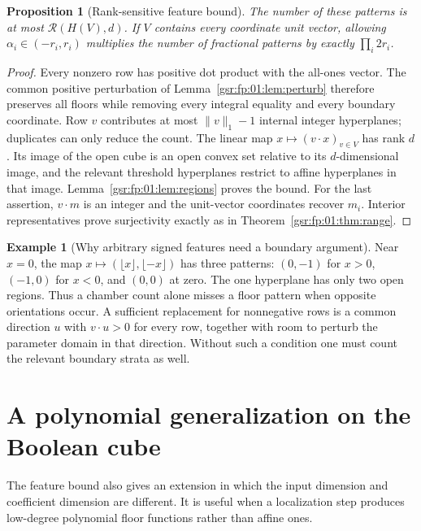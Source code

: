 \documentclass[11pt,letterpaper]{article}
\numberwithin{equation}{section}
\newtheorem{proposition}[theorem]{Proposition}
\theoremstyle{definition}
\newtheorem{example}[theorem]{Example}
\theoremstyle{remark}
\newcommand{\1}{\mathbf 1}
\newcommand{\RR}[2]{\mathcal R(#1,#2)}
\newcommand{\srctag}[1]{\texorpdfstring{\enspace\textup{[#1]}}{ [#1]}}
\newcommand{\srcnote}[2]{\par\noindent{\small\textit{Source #1, delivered #2.}}\par}
\begin{document}
\begin{proposition}[Rank-sensitive feature bound]\label{gsr:fp:01:prop:features}
The number of these patterns is at most $\RR{H(V)}{d}$.
If $V$ contains every coordinate unit vector, allowing
$\alpha_i\in(-r_i,r_i)$ multiplies the number of fractional patterns
by exactly $\prod_i2r_i$.
\end{proposition}
\begin{proof}
Every nonzero row has positive dot product with the all-ones vector.
The common positive perturbation of Lemma~\ref{gsr:fp:01:lem:perturb} therefore
preserves all floors while removing every integral equality and every
boundary coordinate. Row $v$ contributes at most $\|v\|_1-1$ internal
integer hyperplanes; duplicates can only reduce the count.
The linear map $x\mapsto(v\cdot x)_{v\in V}$ has rank $d$. Its image
of the open cube is an open convex set relative to its $d$-dimensional
image, and the relevant threshold hyperplanes restrict to affine
hyperplanes in that image. Lemma~\ref{gsr:fp:01:lem:regions} proves the bound.
For the last assertion, $v\cdot m$ is an integer and the unit-vector
coordinates recover $m_i$. Interior representatives prove surjectivity
exactly as in Theorem~\ref{gsr:fp:01:thm:range}.
\end{proof}

\begin{example}[Why arbitrary signed features need a boundary argument]
Near $x=0$, the map
$x\mapsto(\lfloor x\rfloor,\lfloor-x\rfloor)$ has three patterns:
$(0,-1)$ for $x>0$, $(-1,0)$ for $x<0$, and $(0,0)$ at zero.
The one hyperplane has only two open regions. Thus a chamber count alone
misses a floor pattern when opposite orientations occur. A sufficient
replacement for nonnegative rows is a common direction $u$ with
$v\cdot u>0$ for every row, together with room to perturb the parameter
domain in that direction. Without such a condition one must count the
relevant boundary strata as well.
\end{example}

\section[{A polynomial generalization on the Boolean cube\srctag{01}}]{A polynomial generalization on the Boolean cube}\label{gsr:fp:01:sec:d12}\label{gsr:fp:01:sec:polyfloor}
\srcnote{01}{Section 12}

The feature bound also gives an extension in which the input dimension
and coefficient dimension are different. It is useful when a localization
step produces low-degree polynomial floor functions rather than affine
ones.
\end{document}
